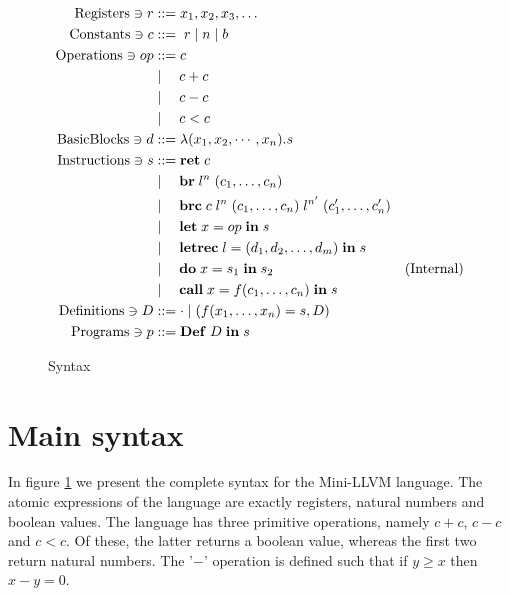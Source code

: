 \documentclass[a4paper, oneside, 10pt, draft]{memoir}
\begin{document}
\newcommand{\ibr}[2]{\mathbf{br} \; #1 \; #2}
\newcommand{\ibrc}[5]{\mathbf{brc} \; #1 \; #2 \; #3 \; #4 \; #5}
\newcommand{\ilet}[3]{\mathbf{let} \; #1 = #2 \; \mathbf{in} \; #3}
\newcommand{\iletrec}[3]{\mathbf{letrec} \; #1 = #2 \; \mathbf{in} \; #3}
\newcommand{\ido}[3]{\mathbf{do} \; #1 = #2 \; \mathbf{in} \; #3}
\newcommand{\icall}[4]{\mathbf{call} \; #1 = #2 #3\; \mathbf{in} \;
  #4}
\newcommand{\ipgm}[2]{\mathbf{Def} \; #1 \; \mathbf{in} \; #2}
\begin{figure}
  \begin{align*}
    \registers \ni r & ::= x_1, x_2, x_3, \dotsc\\
    \constants \ni c & ::= \; r \bor \nat \bor \bool \\
    \operations \ni op & ::= c \\
                       & \bor \quad c + c \\
                       & \bor \quad c - c \\
                       & \bor \quad c < c \\
   \basicblocks \ni d  & ::= \lambda (x_1, x_2, \cdots, x_n) . s\\
   \instructions \ni s & ::= \iret{c} \\
                       & \bor \quad \ibr{l^n}{(c_1, \dotsc, c_n)} \\
                       & \bor \quad \ibrc{c}{l^n}{(c_1, \dotsc, c_n)}{l^{n'}}{(c'_1, \dotsc, c'_n)}\\
                       & \bor \quad \ilet{x}{op}{s} \\
                       & \bor \quad \iletrec{l}{\dbundle}{s} \\
                       & \bor \quad \ido{x}{s_1}{s_2} &
                       (\text{Internal})\\
                       & \bor \quad \icall{x}{f}{(c_1, \dotsc,
                         c_n)}{s}\\
    \definitions \ni D & ::= \cdot \bor (f(x_1, \dotsc, x_n) = s, D)\\
    \programs \ni p & ::= \ipgm{D}{s}
  \end{align*}
  \caption{Syntax}
  \label{fig:syntax}
\end{figure}

\section{Main syntax}

In figure \ref{fig:syntax} we present the complete syntax for the
Mini-LLVM language. The atomic expressions of the language are exactly
registers, natural numbers and boolean values. The language has three
primitive operations, namely $c + c$, $c - c$ and $c < c$. Of these,
the latter returns a boolean value, whereas the first two return
natural numbers. The '$-$' operation is defined such that if $y \geq
x$ then $x - y = 0$.
\end{document}
